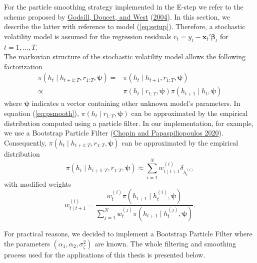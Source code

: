 \documentclass[
  12pt,
]{book}
\theoremstyle{break}
\theoremstyle{nonumberplain}
\begin{document}
For the particle smoothing strategy implemented in the E-step we refer
to the scheme proposed by \protect\hyperlink{ref-GDW_2004}{Godsill,
Doucet, and West} (\protect\hyperlink{ref-GDW_2004}{2004}). In this
section, we describe the latter with reference to model
(\ref{eq:setup}). Therefore, a stochastic volatility model is assumed
for the regression residuals
\(r_{t}=y_{t}-\boldsymbol{x}_{t}'\boldsymbol{\beta}_{t}\) for
\(t=1,\ldots,T\).\\
The markovian structure of the stochastic volatility model allows the
following factorization \begin{equation}
\begin{aligned}\label{eq:psmooth}
\pi(h_{t}\mid h_{t+1:T},r_{1:T},\boldsymbol{\psi}) = & \pi(h_{t}\mid h_{t+1},r_{1:T},\boldsymbol{\psi}) \\ 
\propto & \pi(h_{t}\mid r_{1:T},\boldsymbol{\psi})\pi(h_{t+1}\mid h_{t},\boldsymbol{\psi})
\end{aligned}
\end{equation} where \(\boldsymbol{\psi}\) indicates a vector containing
other unknown model's parameters. In equation (\ref{eq:psmooth}),
\(\pi(h_{t}\mid r_{1:T},\boldsymbol{\psi})\) can be approximated by the
empirical distribution computed using a particle filter. In our
implementation, for example, we use a Bootstrap Particle Filter
(\protect\hyperlink{ref-CP_2020}{Chopin and Papaspiliopoulos 2020}).
Consequently, \(\pi(h_{t}\mid h_{t+1:T},r_{1:T},\boldsymbol{\psi})\) can
be approximated by the empirical distribution
\[ \pi(h_{t}\mid h_{t+1:T},r_{1:T},\boldsymbol{\psi}) \approx \sum_{i=1}^{N}w_{t\mid t+1}^{(i)}\delta_{h_{t}^{(i)}}
\] with modified weights \[
w_{t\mid t+1}^{(i)}=\frac{w_{t}^{(i)}\pi(h_{t+1}\mid h_{t}^{(i)},\boldsymbol{\psi})}{\sum_{j=1}^{N}w_{t}^{(j)}\pi(h_{t+1}\mid h_{t}^{(j)},\boldsymbol{\psi})}.
\]

For practical reasons, we decided to implement a Bootstrap Particle
Filter where the parameters \((\alpha_1,\alpha_2,\sigma^2_{\zeta})\) are
known. The whole filtering and smoothing process used for the
applications of this thesis is presented below.
\end{document}
